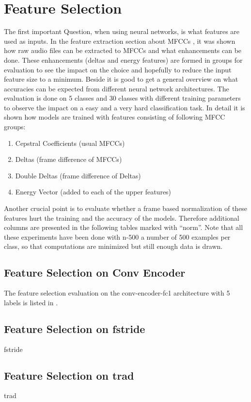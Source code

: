
\section{Feature Selection}\label{sec:exp_fs}
The first important Question, when using neural networks, is what features are used as inputs.
In the feature extraction section about MFCCs , it was shown how raw audio files can be extracted to MFCCs and what enhancements can be done.
These enhancements (deltas and energy features) are formed in groups for evaluation to see the impact on the choice and hopefully to reduce the input feature size to a minimum.
Beside it is good to get a general overview on what accuracies can be expected from different neural network architectures.
The evaluation is done on 5 classes and 30 classes with different training parameters to observe the impact on a easy and a very hard classification task.
In detail it is shown how models are trained with features consisting of following MFCC groups:
\begin{enumerate}
    \item Cepstral Coefficients (usual MFCCs)
    \item Deltas (frame difference of MFCCs)
    \item Double Deltas (frame difference of Deltas)
    \item Energy Vector (added to each of the upper features)
\end{enumerate}
Another crucial point is to evaluate whether a frame based normalization of these features hurt the training and the accuracy of the models.
Therefore additional columns are presented in the following tables marked with \enquote{norm}.
Note that all these experiments have been done with n-500 a number of 500 examples per class, so that computations are minimized but still enough data is drawn.

\subsection{Feature Selection on Conv Encoder}
The feature selection evaluation on the conv-encoder-fc1 architecture with 5 labels is listed in .
% 
% 
% 




\subsection{Feature Selection on fstride}
fstride


\subsection{Feature Selection on trad}
trad


